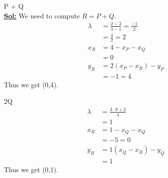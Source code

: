 \documentclass[xcolor=svgnames]{beamer}
\begin{document}
\begin{frame}
    \begin{enumerate}\setcounter{enumi}{1}
        \footnotesize{
        \item P + Q
        \\ \textbf{\underline{Sol:}} We need to compute $R = P+Q$. 
        \begin{align*}
            \lambda &= \frac{2 - 3}{3 - 1} = \frac{-1}{2}
                \\   &= \frac{4}{2} = 2
                \\ x_R &= 4 - x_P - x_Q
                \\ &= 0
                \\ y_R &= 2(x_P - x_R) - y_P
                \\ &= -1 = 4
        \end{align*}
        Thus we get (0,4).
        \item 2Q
        \begin{align*}
            \lambda &= \frac{3\cdot 9 + 2}{4}
                \\  &= 1
                \\ x_R &= 1 - x_Q - x_Q
                \\ &= -5 = 0
                \\ y_R &= 1(x_Q - x_R) - y_Q
                \\ &= 1
        \end{align*}
        Thus we get (0,1).    
        }
        
    \end{enumerate}
\end{frame}
\end{document}
